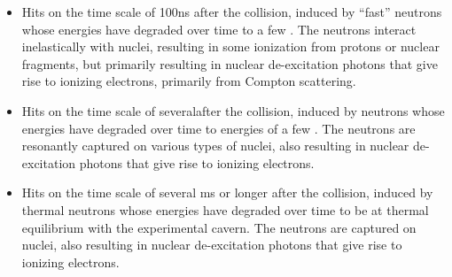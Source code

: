 \begin{itemize}
	\item Hits on the time scale of 100\unit{ns} after the \pp collision, induced by ``fast'' neutrons whose energies have degraded over time to a few \MeVns. The neutrons interact inelastically with nuclei, resulting in some ionization from protons or nuclear fragments, but primarily resulting in nuclear de-excitation photons that give rise to ionizing electrons, primarily from Compton scattering.

	\item Hits on the time scale of several\mus after the \pp collision, induced by neutrons whose energies have degraded over time to energies of a few \keVns. The neutrons are resonantly captured on various types of nuclei, also resulting in nuclear de-excitation photons that give rise to ionizing electrons.

	\item Hits on the time scale of several ms or longer after the \pp collision, induced by thermal neutrons whose energies have degraded over time to be at thermal equilibrium with the experimental cavern. The neutrons are captured on nuclei, also resulting in nuclear de-excitation photons that give rise to ionizing electrons.
\end{itemize}

